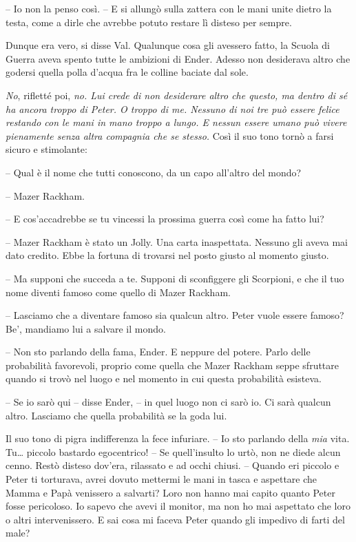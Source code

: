 {-- Io non la penso così. -- E si allungò sulla zattera con le mani
	unite dietro la testa, come a dirle che avrebbe potuto restare lì
	disteso per sempre.}

{Dunque era vero, si disse Val. Qualunque cosa gli avessero fatto, la
	Scuola di Guerra aveva spento tutte le ambizioni di Ender. Adesso non
	desiderava altro che godersi quella polla d'acqua fra le colline baciate
	dal sole.}

\emph{{No}}{, \emph{} rifletté poi, \emph{no. Lui crede di non
		desiderare altro che questo, ma dentro di sé ha ancora troppo di Peter.
		O troppo di me. Nessuno di noi tre può essere felice restando con le
		mani in mano troppo a lungo. E nessun essere umano può vivere pienamente
		senza altra compagnia che se stesso.} Così il suo tono tornò a farsi
	sicuro e stimolante:}

{-- Qual è il nome che tutti conoscono, da un capo all'altro del mondo?}

{-- Mazer Rackham.}

{-- E cos'accadrebbe se tu vincessi la prossima guerra così come ha
	fatto lui?}

{-- Mazer Rackham è stato un Jolly. Una carta inaspettata. Nessuno gli
	aveva mai dato credito. Ebbe la fortuna di trovarsi nel posto giusto al
	momento giusto.}

{-- Ma supponi che succeda a te. Supponi di sconfiggere gli Scorpioni, e
	che il tuo nome diventi famoso come quello di Mazer Rackham.}

{-- Lasciamo che a diventare famoso sia qualcun altro. Peter vuole
	essere famoso? Be', mandiamo lui a salvare il mondo.}

{-- Non sto parlando della fama, Ender. E neppure del potere. Parlo
	delle probabilità favorevoli, proprio come quella che Mazer Rackham
	seppe sfruttare quando si trovò nel luogo e nel momento in cui questa
	probabilità esisteva.}

{-- Se io sarò qui -- disse Ender, -- in quel luogo non ci sarò io. Ci
	sarà qualcun altro. Lasciamo che quella probabilità se la goda lui.}

{Il suo tono di pigra indifferenza la fece infuriare. -- Io sto parlando
	della \emph{mia} vita. Tu\ldots{} piccolo bastardo egocentrico! -- Se
	quell'insulto lo urtò, non ne diede alcun cenno. Restò disteso dov'era,
	rilassato e ad occhi chiusi. -- Quando eri piccolo e Peter ti torturava,
	avrei dovuto mettermi le mani in tasca e aspettare che Mamma e Papà
	venissero a salvarti? Loro non hanno mai capito quanto Peter fosse
	pericoloso. Io sapevo che avevi il monitor, ma non ho mai aspettato che
	loro o altri intervenissero. E sai cosa mi faceva Peter quando gli
	impedivo di farti del male?}

